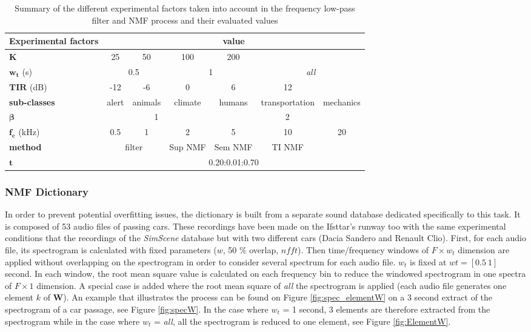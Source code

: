\documentclass[twocolumn,a4paper,10pt]{article}
\begin{document}
\begin{table}[t]
\centering
\begin{tabular}{lcccccc}
\textbf{Experimental factors} &  \multicolumn{6}{c}{value}\\ \toprule
$\mathbf{K}$ & 25 & 50 & 100 & 200 & & \\
\rowcolor[HTML]{EFEFEF}
$\mathbf{w_t}$ (s)& \multicolumn{2}{c}{0.5} & \multicolumn{2}{c}{1}  & \multicolumn{2}{c}{\textit{all}} \\
$\mathbf{TIR}$ (dB) & -12 & -6 & 0 & 6 & 12 &  \\
\rowcolor[HTML]{EFEFEF}
\textbf{sub-classes} & alert & animals & climate & humans & transportation & mechanics \\
$\mathbf{\beta}$ & \multicolumn{3}{c}{1} & \multicolumn{3}{c}{2} \\
\rowcolor[HTML]{EFEFEF}
$\mathbf{f_c}$ (kHz) & 0.5 & 1 & 2 & 5 & 10 & 20 \\
\textbf{method} & \multicolumn{2}{c}{filter} & Sup NMF & Sem NMF & TI NMF \\
\rowcolor[HTML]{EFEFEF}
$\mathbf{t}$ & \multicolumn{6}{c}{0.20:0.01:0.70} \\ \bottomrule
\end{tabular}
\caption{Summary of the different experimental factors taken into account in the frequency low-pass filter and NMF process and their evaluated values}
\label{tab:experimental_factors}
\end{table}


\subsubsection{NMF Dictionary}\label{part:dictionary_learning}

In order to prevent potential overfitting issues, the dictionary is built from a separate sound database dedicated specifically to this task. It is composed of 53 audio files of passing cars. These recordings have been made on the Ifsttar's runway too with the same experimental conditions that the recordings of the \textit{SimScene} database but with two different cars (Dacia Sandero and Renault Clio). First, for each audio file, its spectrogram is calculated with fixed parameters ($w$, 50 $\%$ overlap, $nfft$). Then time/frequency windows of $F \times w_t $ dimension are applied without overlapping on the spectrogram in order to consider several spectrum for each audio file. $w_t$ is fixed at $wt = [0.5~1]$ second. In each window, the root mean square value is calculated on each frequency bin to reduce the windowed spectrogram in one spectra of $F \times 1$ dimension.  A special case is added where the root mean square of \textit{all} the spectrogram is applied (each audio file generates one element $k$ of $\mathbf{W}$). An example that illustrates the process can be found on Figure \ref{fig:spec_elementW} on a 3 second extract of the spectrogram of a car passage, see Figure \ref{fig:specW}. In the case where $w_t$ = 1 second, 3 elements are therefore extracted from the spectrogram while in the case where $w_t$ = \textit{all}, all the spectrogram is reduced to one element, see Figure \ref{fig:ElementW}.
\end{document}
